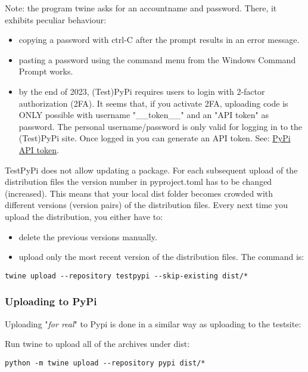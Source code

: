 Note: the program \textsf{twine} asks for an accountname and password. There, it exhibits peculiar behaviour:
\begin{itemize}
	\item copying a password with ctrl-C after the prompt results in an error message.
	\item pasting a password using the command menu from the Windows Command Prompt works.
	\item by the end of 2023, (Test)PyPi requires users to login with 2-factor authorization (2FA). It seems that, if you activate 2FA, uploading code is ONLY possible with username "\_\_token\_\_" and an "API token" as password. The personal username/password is only valid for logging in to the (Test)PyPi site. Once logged in you can generate an API token.  See: \href{https://pypi.org/help/#apitoken}{PyPi API token}.
\end{itemize} 

TestPyPi does not allow updating a package. For each subsequent upload of the distribution files the version number in \textsf{pyproject.toml} has to be changed (increased). This means that your local \textsf{dist} folder becomes crowded with different versions (version pairs) of the distribution files. Every next time you upload the distribution, you either have to:
\begin{itemize}
	\item delete the previous versions manually.
	\item upload only the most recent version of the distribution files. The command is:
\end{itemize} 

\begin{lstlisting}[style=DOS]
	twine upload --repository testpypi --skip-existing dist/*
\end{lstlisting}

\subsubsection{Uploading to PyPi}

Uploading "\emph{for real}" to Pypi is done in a similar way as uploading to the testsite:

Run \textsf{twine} to upload all of the archives under dist:

\begin{lstlisting}[style=DOS]
	python -m twine upload --repository pypi dist/*
\end{lstlisting}

